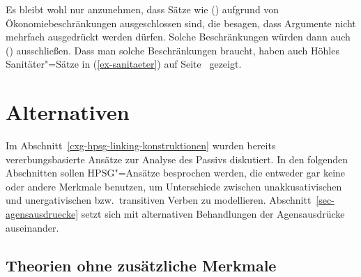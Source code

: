 {Es bleibt wohl nur anzunehmen, dass Sätze wie () aufgrund von Ökonomiebeschränkungen
ausgeschlossen sind, die besagen, dass Argumente nicht mehrfach ausgedrückt werden dürfen.
Solche Beschränkungen würden dann auch () ausschließen. Dass man solche Beschränkungen
braucht, haben auch Höhles Sanitäter"=Sätze in (\ref{ex-sanitaeter}) auf Seite~\pageref{ex-sanitaeter} gezeigt.






\section{Alternativen}

Im Abschnitt~\ref{cxg-hpsg-linking-konstruktionen} wurden bereits vererbungsbasierte Ansätze zur
Analyse des Passivs diskutiert. In den folgenden Abschnitten sollen HPSG"=Ansätze besprochen werden,
die entweder gar keine oder andere Merkmale benutzen, um Unterschiede zwischen unakkusativischen und
unergativischen bzw.\ transitiven Verben zu modellieren. Abschnitt~\ref{sec-agensausdruecke} setzt
sich mit alternativen Behandlungen der Agensausdrücke auseinander.

\subsection{Theorien ohne zusätzliche Merkmale}



}
